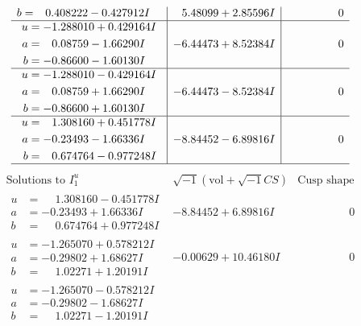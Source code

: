 \documentclass[1p]{elsarticle_modified}
\theoremstyle{definition}
\newcommand{\I}{\sqrt{-1}}
\begin{document}
$$\begin{array}{c|c|c}
\begin{aligned}
b &= \phantom{-}0.408222 - 0.427912 I\end{aligned}
 & \phantom{-}5.48099 + 2.85596 I & \phantom{-0.000000 } 0 \\ \hline\begin{aligned}
u &= -1.288010 + 0.429164 I \\
a &= \phantom{-}0.08759 - 1.66290 I \\
b &= -0.86600 - 1.60130 I\end{aligned}
 & -6.44473 + 8.52384 I & \phantom{-0.000000 } 0 \\ \hline\begin{aligned}
u &= -1.288010 - 0.429164 I \\
a &= \phantom{-}0.08759 + 1.66290 I \\
b &= -0.86600 + 1.60130 I\end{aligned}
 & -6.44473 - 8.52384 I & \phantom{-0.000000 } 0 \\ \hline\begin{aligned}
u &= \phantom{-}1.308160 + 0.451778 I \\
a &= -0.23493 - 1.66336 I \\
b &= \phantom{-}0.674764 - 0.977248 I\end{aligned}
 & -8.84452 - 6.89816 I & \phantom{-0.000000 } 0\\
 \hline 
 \end{array}$$\newpage$$\begin{array}{c|c|c}  
\text{Solutions to }I^u_{1}& \I (\text{vol} + \sqrt{-1}CS) & \text{Cusp shape}\\
 \hline 
\begin{aligned}
u &= \phantom{-}1.308160 - 0.451778 I \\
a &= -0.23493 + 1.66336 I \\
b &= \phantom{-}0.674764 + 0.977248 I\end{aligned}
 & -8.84452 + 6.89816 I & \phantom{-0.000000 } 0 \\ \hline\begin{aligned}
u &= -1.265070 + 0.578212 I \\
a &= -0.29802 + 1.68627 I \\
b &= \phantom{-}1.02271 + 1.20191 I\end{aligned}
 & -0.00629 + 10.46180 I & \phantom{-0.000000 } 0 \\ \hline\begin{aligned}
u &= -1.265070 - 0.578212 I \\
a &= -0.29802 - 1.68627 I \\
b &= \phantom{-}1.02271 - 1.20191 I\end{aligned}

\end{array}$$
\end{document}
